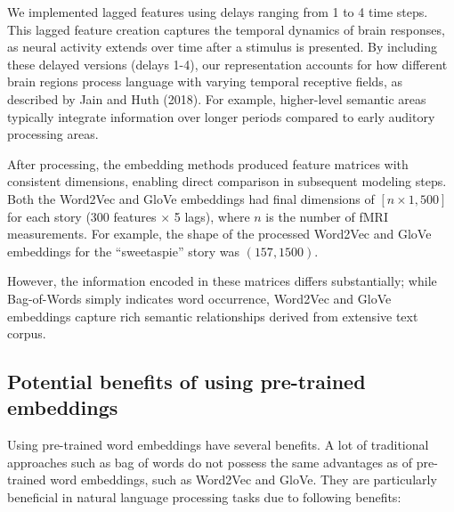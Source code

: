 \documentclass[12pt,letterpaper]{article}
\begin{document}
We implemented lagged features using delays ranging from 1 to 4 time steps. This lagged feature creation captures the temporal dynamics of brain responses, as neural activity extends over time after a stimulus is presented. By including these delayed versions (delays 1-4), our representation accounts for how different brain regions process language with varying temporal receptive fields, as described by Jain and Huth (2018). For example, higher-level semantic areas typically integrate information over longer periods compared to early auditory processing areas.

After processing, the embedding methods produced feature matrices with consistent dimensions, enabling direct comparison in subsequent modeling steps. Both the Word2Vec and GloVe embeddings had final dimensions of $[n \times 1,500]$ for each story (300 features $\times$ 5 lags), where $n$ is the number of fMRI measurements. For example, the shape of the processed Word2Vec and GloVe embeddings for the ``sweetaspie'' story was $(157, 1500)$.

However, the information encoded in these matrices differs substantially; while Bag-of-Words simply indicates word occurrence, Word2Vec and GloVe embeddings capture rich semantic relationships derived from extensive text corpus.

 


\subsection{Potential benefits of using pre-trained embeddings}

Using pre-trained word embeddings have several benefits. A lot of traditional approaches such as bag of words do not possess the same advantages as of pre-trained word embeddings, such as Word2Vec and GloVe. They are particularly beneficial in natural language processing tasks due to following benefits:
\end{document}
